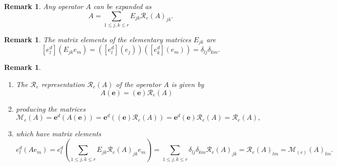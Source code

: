 \documentclass[aps,preprint]{revtex4}%
\newtheorem{remark}[theorem]{Remark}
\begin{document}
\begin{remark}
Any operator $A$ can be expanded as
\begin{equation}
A=\sum_{1\leq j,k\leq r}E_{jk}\mathcal{R}_{e}\left(  A\right)  _{jk}.
\end{equation}

\end{remark}

\begin{remark}
The matrix elements of the elementary matrices $E_{jk}$ are
\begin{equation}
\left[  e_{l}^{d}\right]  \left(  E_{jk}e_{m}\right)  =\left(  \left[
e_{l}^{d}\right]  \left(  e_{j}\right)  \right)  \left(  \left[  e_{k}%
^{d}\right]  \left(  e_{m}\right)  \right)  =\delta_{lj}\delta_{km}.
\end{equation}

\end{remark}

\begin{remark}
\begin{enumerate}
\item The $\mathcal{R}_{e}$ representation $\mathcal{R}_{e}\left(  A\right)  $
of the operator $A$ is given by
\begin{equation}
A\left(  \mathbf{e}\right)  =\left(  \mathbf{e}\right)  \mathcal{R}_{e}\left(
A\right)
\end{equation}


\item producing the matrices
\begin{equation}
\mathcal{M}_{e}\left(  A\right)  =\mathbf{e}^{d}\left(  A\left(
\mathbf{e}\right)  \right)  =\mathbf{e}^{d}\left(  \left(  \mathbf{e}\right)
\mathcal{R}_{e}\left(  A\right)  \right)  =\mathbf{e}^{d}\left(
\mathbf{e}\right)  \mathcal{R}_{e}\left(  A\right)  =\mathcal{R}_{e}\left(
A\right)  ,
\end{equation}


\item which have matrix elements
\begin{equation}
e_{l}^{d}\left(  Ae_{m}\right)  =e_{l}^{d}\left(  \sum_{1\leq j,k\leq r}%
E_{jk}\mathcal{R}_{e}\left(  A\right)  _{jk}e_{m}\right)  =\sum_{1\leq j,k\leq
r}\delta_{lj}\delta_{km}\mathcal{R}_{e}\left(  A\right)  _{jk}=\mathcal{R}%
_{e}\left(  A\right)  _{lm}=\mathcal{M}_{\left(  e\right)  }\left(  A\right)
_{lm}.
\end{equation}

\end{enumerate}
\end{remark}
\end{document}
